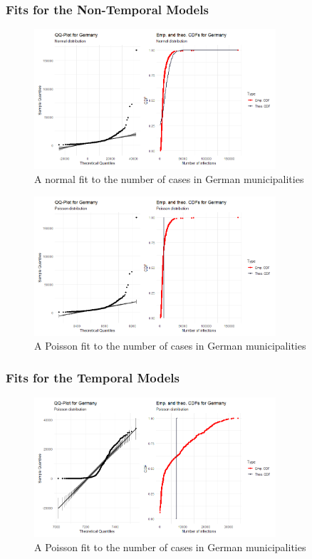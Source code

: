 \subsubsection{Fits for the Non-Temporal Models}
\begin{figure}[H]
    \centering
    \includegraphics[width = 0.8\textwidth]{fit_normal_germany.png}
    \caption{A normal fit to the number of cases in German municipalities}
    \label{fitNormalGermany}
\end{figure}
\begin{figure}[H]
    \centering
    \includegraphics[width = 0.8\textwidth]{fit_poisson_germany.png}
    \caption{A Poisson fit to the number of cases in German municipalities}
    \label{fitPoissonGermany}
\end{figure}
\subsubsection{Fits for the Temporal Models}\label{sec:temp_fit_germany}
\begin{figure}[H]
  \centering
  \includegraphics[width = 0.8\textwidth]{fit_poisson_germany_ts.png}
  \caption{A Poisson fit to the number of cases in German municipalities}
  \label{fitPoissonGermany_ts}
\end{figure}
